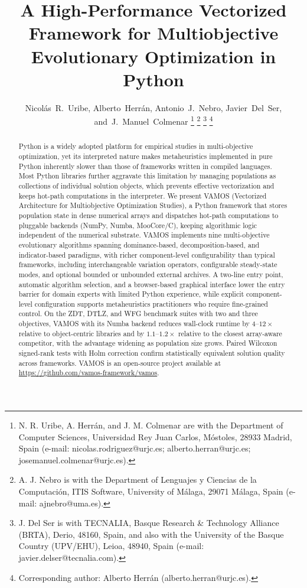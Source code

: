 \documentclass[journal]{IEEEtran}
\title{A High-Performance Vectorized Framework for Multiobjective Evolutionary Optimization in Python}
\author{Nicol\'{a}s~R.~Uribe,
        Alberto~Herr\'{a}n,
        Antonio~J.~Nebro,
        Javier~Del~Ser,
        and~J.~Manuel~Colmenar%
\thanks{N. R. Uribe, A. Herr\'{a}n, and J. M. Colmenar are with the
  Department of Computer Sciences, Universidad Rey Juan Carlos, M\'{o}stoles,
  28933 Madrid, Spain (e-mail: nicolas.rodriguez@urjc.es; alberto.herran@urjc.es;
  josemanuel.colmenar@urjc.es).}%
\thanks{A. J. Nebro is with the Department of Lenguajes y Ciencias de la
  Computaci\'{o}n, ITIS Software, University of M\'{a}laga, 29071
  M\'{a}laga, Spain (e-mail: ajnebro@uma.es).}%
\thanks{J. Del Ser is with TECNALIA, Basque Research \& Technology
  Alliance (BRTA), Derio, 48160, Spain, and also with the University
  of the Basque Country (UPV/EHU), Leioa, 48940, Spain (e-mail: javier.delser@tecnalia.com).}%
\thanks{Corresponding author: Alberto Herr\'{a}n (alberto.herran@urjc.es).}%
}
\begin{document}
\maketitle

\begin{abstract}
Python is a widely adopted platform for empirical studies in
multi-objective optimization, yet its interpreted nature makes
metaheuristics implemented in pure Python inherently slower than those of frameworks
written in compiled languages.
Most Python libraries further aggravate this limitation by managing
populations as collections of individual solution objects, which
prevents effective vectorization and keeps hot-path computations in
the interpreter.
We present VAMOS (Vectorized Architecture for Multiobjective
Optimization Studies), a Python framework that stores population state
in dense numerical arrays and dispatches hot-path computations to
pluggable backends (NumPy, Numba, MooCore/C), keeping algorithmic logic
independent of the numerical substrate.
VAMOS implements nine multi-objective evolutionary algorithms
spanning dominance-based, decomposition-based, and indicator-based paradigms, with richer component-level
configurability than typical frameworks, including interchangeable
variation operators, configurable steady-state modes, and
optional bounded or unbounded external archives.
A two-line entry point, automatic algorithm selection, and a
browser-based graphical interface lower the entry barrier for domain experts
with limited Python experience, while explicit component-level configuration
supports metaheuristics practitioners who require fine-grained control.
On the ZDT, DTLZ, and WFG benchmark suites with two and three objectives, VAMOS with its Numba backend reduces wall-clock runtime by $4$--$12\times$ relative to object-centric libraries and by $1.1$--$1.2\times$ relative to the closest array-aware competitor, with the advantage widening as population size grows. Paired Wilcoxon signed-rank tests with Holm correction confirm statistically equivalent solution quality across frameworks.
VAMOS is an open-source project available at \url{https://github.com/vamos-framework/vamos}.
\end{abstract}
\end{document}
